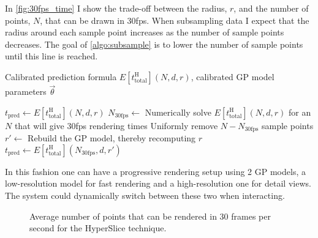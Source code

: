 In \autoref{fig:30fps_time} I show the trade-off between the radius, $r$, and the
number of points, $N$, that can be drawn in 30fps.  When subsampling data I
expect that the radius around each sample point increases as the number of
sample points decreases.
The goal of \autoref{algo:subsample} is to 
lower the number of sample points until this line is reached.

\begin{algorithm}
  \caption[Subsampling data to achieve interactive rendering time]{%
    A proposed algorithm for subsampling data in order to achieve
    interactive rendering times using the Gaussian process model
    with the HyperSlice rendering technique.
  }
  \label{algo:subsample}
  \begin{algorithmic}
    \Require Calibrated prediction formula $E[t_\text{total}^\text{H}](N, d, r)$,
             calibrated GP model parameters $\vec{\theta}$

    \State $t_\text{pred} \gets E[t_\text{total}^\text{H}](N, d, r)$\;
      \State $N_\text{30fps} \gets$ Numerically solve $E[t_\text{total}^\text{H}](N, d, r)$ for an $N$ that will give 30fps rendering times\;
      \State Uniformly remove $N - N_\text{30fps}$ sample points\;
      \State $r' \gets$ Rebuild the GP model, thereby recomputing $r$\;
      \State $t_\text{pred} \gets E[t_\text{total}^\text{H}](N_\text{30fps}, d, r')$\;
    \EndWhile
  \end{algorithmic}
\end{algorithm}

In this fashion one can have a progressive rendering setup using 2 GP models, 
a low-resolution model for fast rendering and a high-resolution one for
detail views.  The system could dynamically switch between these two when
interacting.

\begin{figure}[h]
  \centering
  \resizebox{\linewidth}{!}{%
    {\tiny }}
  \caption[Interactive rendering times for various dimensions]{%
    Average number of points that can be rendered in 30 frames per 
    second for the HyperSlice technique.
  }
  \label{fig:30fps_time}
\end{figure}

